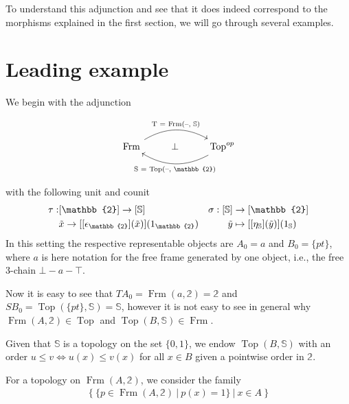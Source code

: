 \documentclass[12pt,a4paper]{article}
\DeclareMathOperator{\Hom}{Hom}
\DeclareMathOperator{\Set}{Set}
\DeclareMathOperator{\Frm}{Frm}
\DeclareMathOperator{\Top}{Top}
\def\HomA{\ensuremath\mathcal{A}}
\def\t{\ensuremath\tilde}
\begin{document}
To understand this adjunction and see that it does indeed correspond to the morphisms explained in the first section, we will go through several examples.
\section{Leading example}


We begin with the adjunction 

\[\begin{tikzcd}
	{\Frm} & \bot & {\Top^{op}}
	\arrow["{\text{T = $\Frm$(--, $\mathbb{S}$)}}" , bend left, from=1-1, to=1-3]
	\arrow["{\text{S = $\Top$(--, $\mathbb{2}$)}}", bend left, from=1-3, to=1-1]
\end{tikzcd}\]

with the following unit and counit
\begin{align*}
	\tau:& [\mathbb{2}] \to [\mathbb{S}] & \sigma: [\mathbb{S}]&\to [\mathbb{2}]\\
	&\t x \to  [[\epsilon_{\mathbb{2}}](\t x)](1_{\mathbb{2}})&\t y &\mapsto [[\eta_{\mathbb{S}}](\t y)](1_{\mathbb{S}})
\end{align*}
In this setting  the respective representable objects are $A_0 = a$ and $B_0 = \{pt\}$, where $a$ is here  notation for the free frame generated by one object, i.e., the free 3-chain $\bot - a - \top$. 

Now it is easy to see that $TA_0 = \Frm(a, \mathbb{2}) = \mathbb{2}$ and $SB_0 = \Top(\{pt\}, \mathbb{S}) = \mathbb{S}$, however it is not easy to see in general why $\Frm(A, \mathbb{2}) \in \Top$ and $\Top(B, \mathbb{S}) \in \Frm$.

Given that $\mathbb{S}$ is a topology on the set $\{0,1\}$, we endow $\Top(B, \mathbb{S})$ with an order $u \leq v \iff u(x) \leq v(x)$ for all $x \in B$ given a pointwise order in $\mathbb{2}$. 


For a topology on $\Frm(A, \mathbb{2})$, we consider the family \begin{align*}
	\{ \  \{p \in \Frm(A, \mathbb{2}) \   \lvert \  p(x) = 1 \} \ \lvert \ x \in A \ \} 
\end{align*} 
\end{document}
